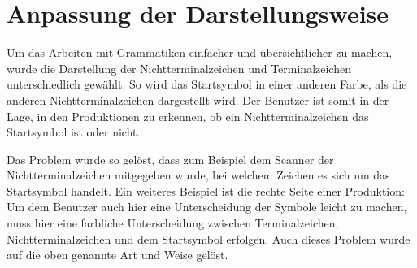 \section{Anpassung der Darstellungsweise}\label{ParserAdaption}

Um das Arbeiten mit Grammatiken einfacher und übersichtlicher zu
machen, wurde die Darstellung der Nichtterminalzeichen und
Terminalzeichen unterschiedlich gewählt. So wird das Startsymbol in einer
anderen Farbe, als die anderen Nichtterminalzeichen dargestellt wird. Der
Benutzer ist somit in der Lage, in den Produktionen zu erkennen, ob ein
Nichtterminalzeichen das Startsymbol ist oder nicht.\vspace{10pt}

Das Problem wurde so gelöst, dass zum Beispiel dem Scanner der
Nichtterminalzeichen mitgegeben wurde, bei welchem Zeichen es sich um das
Startsymbol handelt. Ein weiteres Beispiel ist die rechte Seite einer
Produktion: Um dem Benutzer auch hier eine Unterscheidung der Symbole leicht zu
machen, muss hier eine farbliche Unterscheidung zwischen Terminalzeichen,
Nichtterminalzeichen und dem Startsymbol erfolgen. Auch dieses Problem wurde auf
die oben genannte Art und Weise gelöst.\vspace{10pt}


